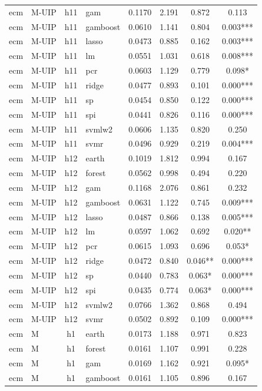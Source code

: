\begin{ThreePartTable}
\begin{longtable}[t]{llclcccc}
ecm & M-UIP & h11 & gam & 0.1170 & 2.191 & 0.872 & 0.113\\
ecm & M-UIP & h11 & gamboost & 0.0610 & 1.141 & 0.804 & 0.003***\\
ecm & M-UIP & h11 & lasso & 0.0473 & 0.885 & 0.162 & 0.003***\\
ecm & M-UIP & h11 & lm & 0.0551 & 1.031 & 0.618 & 0.008***\\
ecm & M-UIP & h11 & pcr & 0.0603 & 1.129 & 0.779 & 0.098*\\
ecm & M-UIP & h11 & ridge & 0.0477 & 0.893 & 0.101 & 0.000***\\
ecm & M-UIP & h11 & sp & 0.0454 & 0.850 & 0.122 & 0.000***\\
ecm & M-UIP & h11 & spi & 0.0441 & 0.826 & 0.116 & 0.000***\\
ecm & M-UIP & h11 & svmlw2 & 0.0606 & 1.135 & 0.820 & 0.250\\
ecm & M-UIP & h11 & svmr & 0.0496 & 0.929 & 0.219 & 0.004***\\
\addlinespace
ecm & M-UIP & h12 & earth & 0.1019 & 1.812 & 0.994 & 0.167\\
ecm & M-UIP & h12 & forest & 0.0562 & 0.998 & 0.494 & 0.220\\
ecm & M-UIP & h12 & gam & 0.1168 & 2.076 & 0.861 & 0.232\\
ecm & M-UIP & h12 & gamboost & 0.0631 & 1.122 & 0.745 & 0.009***\\
ecm & M-UIP & h12 & lasso & 0.0487 & 0.866 & 0.138 & 0.005***\\
ecm & M-UIP & h12 & lm & 0.0597 & 1.062 & 0.692 & 0.020**\\
ecm & M-UIP & h12 & pcr & 0.0615 & 1.093 & 0.696 & 0.053*\\
ecm & M-UIP & h12 & ridge & 0.0472 & 0.840 & 0.046** & 0.000***\\
ecm & M-UIP & h12 & sp & 0.0440 & 0.783 & 0.063* & 0.000***\\
ecm & M-UIP & h12 & spi & 0.0435 & 0.774 & 0.063* & 0.000***\\
ecm & M-UIP & h12 & svmlw2 & 0.0766 & 1.362 & 0.868 & 0.494\\
ecm & M-UIP & h12 & svmr & 0.0502 & 0.892 & 0.109 & 0.000***\\
\addlinespace
ecm & M & h1 & earth & 0.0173 & 1.188 & 0.971 & 0.823\\
ecm & M & h1 & forest & 0.0161 & 1.107 & 0.991 & 0.228\\
ecm & M & h1 & gam & 0.0169 & 1.162 & 0.921 & 0.095*\\
ecm & M & h1 & gamboost & 0.0161 & 1.105 & 0.896 & 0.167\\

\end{longtable}
\end{ThreePartTable}
